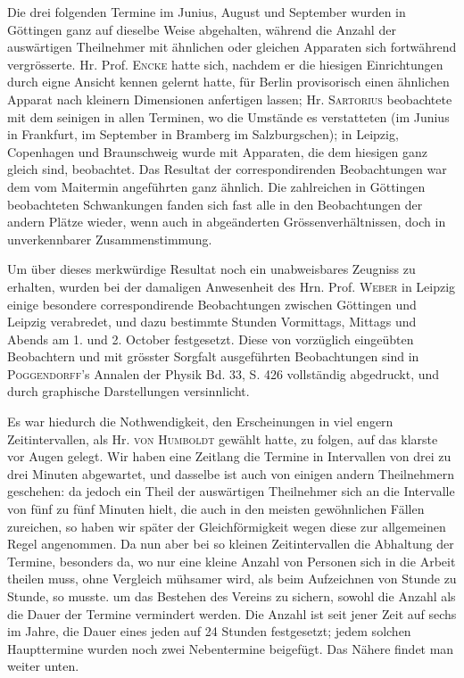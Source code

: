Die drei folgenden Termine im Junius, August und September wurden in Göttingen ganz auf dieselbe Weise abgehalten, während die Anzahl der auswärtigen Theilnehmer mit ähnlichen oder gleichen Apparaten sich fortwährend vergrösserte. Hr. Prof. \textsc{Encke} hatte sich, nachdem er die hiesigen Einrichtungen durch eigne Ansicht kennen gelernt hatte, für Berlin provisorisch einen ähnlichen Apparat nach kleinern Dimensionen anfertigen lassen; Hr. \textsc{Sartorius} beobachtete mit dem seinigen in allen Terminen, wo die Umstände es verstatteten (im Junius in Frankfurt, im September in Bramberg im Salzburgschen); in Leipzig, Copenhagen und Braunschweig wurde mit Apparaten, die dem hiesigen ganz gleich sind, beobachtet. Das Resultat der correspondirenden Beobachtungen war dem vom Maitermin angeführten ganz ähnlich. Die zahlreichen in Göttingen beobachteten Schwankungen fanden sich fast alle in den Beobachtungen der andern Plätze wieder, wenn auch in abgeänderten Grössenverhältnissen, doch in unverkennbarer Zusammenstimmung.

Um über dieses merkwürdige Resultat noch ein unabweisbares Zeugniss zu erhalten, wurden bei der damaligen Anwesenheit des Hrn. Prof. \textsc{Weber} in Leipzig einige besondere correspondirende Beobachtungen zwischen Göttingen und Leipzig verabredet, und dazu bestimmte Stunden Vormittags, Mittags und Abends am 1. und 2. October festgesetzt. Diese von vorzüglich eingeübten Beobachtern und mit grösster Sorgfalt ausgeführten Beobachtungen sind in \textsc{Poggendorff}'s Annalen der Physik Bd. 33, S. 426 vollständig abgedruckt, und durch graphische Darstellungen versinnlicht.

Es war hiedurch die Nothwendigkeit, den Erscheinungen in viel engern Zeitintervallen, als Hr. \textsc{von Humboldt} gewählt hatte, zu folgen, auf das klarste vor Augen gelegt. Wir haben eine Zeitlang die Termine in Intervallen von drei zu drei Minuten abgewartet, und dasselbe ist auch von einigen andern Theilnehmern geschehen: da jedoch ein Theil der auswärtigen Theilnehmer sich an die Intervalle von fünf zu fünf Minuten hielt, die auch in den meisten gewöhnlichen Fällen zureichen, so haben wir später der Gleichförmigkeit wegen diese zur allgemeinen Regel angenommen. Da nun aber bei so kleinen Zeitintervallen die
Abhaltung der Termine, besonders da, wo nur eine kleine Anzahl von Personen sich in die Arbeit theilen muss, ohne Vergleich mühsamer wird, als beim Aufzeichnen von Stunde zu Stunde, so musste. um das Bestehen des Vereins zu sichern, sowohl die Anzahl als die Dauer der Termine vermindert werden. Die Anzahl ist seit jener Zeit auf sechs im Jahre, die Dauer eines jeden auf 24 Stunden festgesetzt; jedem solchen Haupttermine wurden noch zwei Nebentermine beigefügt. Das Nähere findet man weiter unten.

